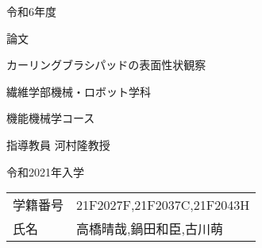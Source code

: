 \documentclass[main]{subfiles}
\begin{document}
\begin{titlepage}
    \fontsize{30pt}{30pt} \selectfont

    \centering
    \Huge
    令和6年度
    \vspace{15pt}

    論文
    \vspace{45pt}

    カーリングブラシパッドの表面性状観察
    \vspace{45pt}

    繊維学部機械・ロボット学科
    \vspace{15pt}

    機能機械学コース
    \vspace{15pt}

    指導教員 河村隆教授
    \vspace{45pt}

    令和2021年入学
    \vspace{15pt}

    \begin{tabular}{ll}
    学籍番号 & 21F2027F,21F2037C,21F2043H\\
    氏名   & 高橋晴哉,鍋田和臣,古川萌\\

    \end{tabular}
    \normalsize

\end{titlepage}
\end{document}

